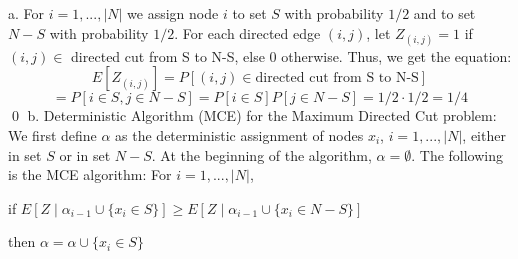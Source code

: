 \documentclass[oneside]{homework} %
\begin{document}
\maketitle
\skipevenpage

{\large a.} For $i = 1,...,|N|$ we assign node $i$ to set $S$ with probability $1/2$ and to set $N-S$ with probability $1/2$. For each directed edge $(i, j)$, let $Z_{(i,j)} = 1$ if $(i, j) \in$ directed cut from S to N-S, else 0 otherwise. Thus, we get the equation: $$E[Z_{(i,j)}] = P[(i,j) \in \text{directed cut from S to N-S}]$$ $$= P[i \in S, j \in N-S] = P[i \in  S]P[j \in N-S] = 1/2 \cdot 1/2 = 1/4$$ \hfill\qed
\newline
\newline
{\large b.} Deterministic Algorithm (MCE) for the Maximum Directed Cut problem:
\newline
We first define $\alpha$ as the deterministic assignment of nodes $x_i$, $i = 1,...,|N|$, either in set $S$ or in set $N-S$. At the beginning of the algorithm, $\alpha = \emptyset$. The following is the MCE algorithm:
\newline
For $i = 1,...,|N|$,  \newline

if $E[Z \mid \alpha_{i-1} \cup \{x_i \in S\}] \geq E[Z \mid \alpha_{i-1} \cup \{x_i \in N-S\}]$  \newline

\quad \quad then $\alpha = \alpha \cup \{x_i \in S\}$ \newline
\end{document}
